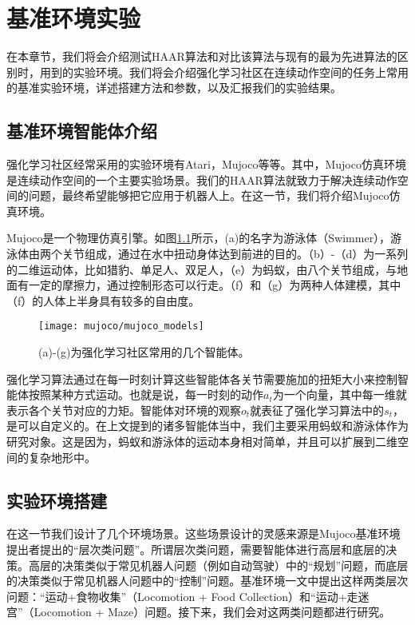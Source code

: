 \chapter{基准环境实验}
在本章节，我们将会介绍测试HAAR算法和对比该算法与现有的最为先进算法的区别时，用到的实验环境。我们将会介绍强化学习社区在连续动作空间的任务上常用的基准实验环境，详述搭建方法和参数，以及汇报我们的实验结果。

\section{基准环境智能体介绍}
强化学习社区经常采用的实验环境有Atari\cite{atari_2013}，Mujoco\cite{benchmarking_RL}等等。其中，Mujoco仿真环境是连续动作空间的一个主要实验场景。我们的HAAR算法就致力于解决连续动作空间的问题，最终希望能够把它应用于机器人上。在这一节，我们将介绍Mujoco仿真环境。

Mujoco是一个物理仿真引擎。如图\ref{fig:mujoco}所示，(a)的名字为游泳体（Swimmer），游泳体由两个关节组成，通过在水中扭动身体达到前进的目的。（b）-（d）为一系列的二维运动体，比如猎豹、单足人、双足人，（e）为蚂蚁，由八个关节组成，与地面有一定的摩擦力，通过控制形态可以行走。（f）和（g）为两种人体建模，其中（f）的人体上半身具有较多的自由度。

	\begin{figure}[h] %
        \centering
        \texttt{[image: mujoco/mujoco\_models]}
        \caption{(a)-(g)为强化学习社区常用的几个智能体。}
        \label{fig:mujoco}
    \end{figure}
    
强化学习算法通过在每一时刻计算这些智能体各关节需要施加的扭矩大小来控制智能体按照某种方式运动。也就是说，每一时刻的动作$a_t$为一个向量，其中每一维就表示各个关节对应的力矩。智能体对环境的观察$o_t$就表征了强化学习算法中的$s_t$，是可以自定义的。在上文提到的诸多智能体当中，我们主要采用蚂蚁和游泳体作为研究对象。这是因为，蚂蚁和游泳体的运动本身相对简单，并且可以扩展到二维空间的复杂地形中。

\section{实验环境搭建}
在这一节我们设计了几个环境场景。这些场景设计的灵感来源是Mujoco基准环境提出者\cite{benchmarking_RL}提出的``层次类问题''。所谓层次类问题，需要智能体进行高层和底层的决策。高层的决策类似于常见机器人问题（例如自动驾驶）中的``规划''问题，而底层的决策类似于常见机器人问题中的``控制''问题。基准环境\cite{benchmarking_RL}一文中提出这样两类层次问题：``运动+食物收集''（Locomotion + Food Collection）和``运动+走迷宫''（Locomotion + Maze）问题。接下来，我们会对这两类问题都进行研究。

